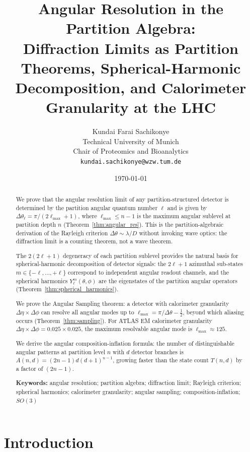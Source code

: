 \documentclass[twocolumn,10pt,a4paper]{article}
\title{\textbf{Angular Resolution in the Partition Algebra:\\
Diffraction Limits as Partition Theorems, Spherical-Harmonic\\
Decomposition, and Calorimeter Granularity at the LHC}}
\author{
Kundai Farai Sachikonye\\
Technical University of Munich\\
Chair of Proteomics and Bioanalytics\\
\texttt{kundai.sachikonye@wzw.tum.de}
}
\date{\today}
\theoremstyle{thmstyle}
\theoremstyle{definition}
\theoremstyle{remark}
\begin{document}
\maketitle

\begin{abstract}
\noindent
We prove that the angular resolution limit of any partition-structured
detector is determined by the partition angular quantum number $\ell$
and is given by $\Delta\theta_\ell = \pi/(2\ell_{\max}+1)$, where
$\ell_{\max} \leq n-1$ is the maximum angular sublevel at partition depth $n$
(Theorem~\ref{thm:angular_res}). This is the partition-algebraic derivation
of the Rayleigh criterion $\Delta\theta \sim \lambda/D$ without invoking
wave optics: the diffraction limit is a counting theorem, not a wave theorem.

The $2(2\ell+1)$ degeneracy of each partition sublevel provides the
natural basis for spherical-harmonic decomposition of detector signals:
the $2\ell+1$ azimuthal sub-states $m \in \{-\ell, \ldots, +\ell\}$
correspond to independent angular readout channels, and the spherical
harmonics $Y_\ell^m(\theta,\phi)$ are the eigenstates of the partition
angular operators (Theorem~\ref{thm:spherical_harmonics}).

We prove the Angular Sampling theorem: a detector with calorimeter
granularity $\Delta\eta \times \Delta\phi$ can resolve all angular modes
up to $\ell_{\max} = \pi/\Delta\theta - \tfrac{1}{2}$, beyond which
aliasing occurs (Theorem~\ref{thm:sampling}). For ATLAS EM calorimeter
granularity $\Delta\eta \times \Delta\phi = 0.025 \times 0.025$,
the maximum resolvable angular mode is $\ell_{\max} \approx 125$.

We derive the angular composition-inflation formula: the number of
distinguishable angular patterns at partition level $n$ with $d$ detector
branches is $A(n,d) = (2n-1)d(d+1)^{n-1}$, growing faster than the
state count $T(n,d)$ by a factor of $(2n-1)$.

\medskip
\noindent\textbf{Keywords:} angular resolution; partition algebra;
diffraction limit; Rayleigh criterion; spherical harmonics;
calorimeter granularity; angular sampling; composition-inflation; $SO(3)$
\end{abstract}

\tableofcontents

\section{Introduction}
\label{sec:intro}
\end{document}
